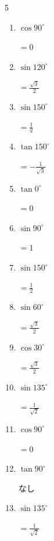 \begin{multicols}{5}
\begin{enumerate}
        $\displaystyle =\frac{\sqrt{3}}{2}$

  \item $\displaystyle \cos{90^\circ}$

        $\displaystyle =0$

  \item $\displaystyle \sin{120^\circ}$

        $\displaystyle =\frac{\sqrt{3}}{2}$

  \item $\displaystyle \sin{150^\circ}$

        $\displaystyle =\frac{1}{2}$

  \item $\displaystyle \tan{150^\circ}$

        $\displaystyle =-\frac{1}{\sqrt{3}}$

  \item $\displaystyle \tan{0^\circ}$

        $\displaystyle =0$

  \item $\displaystyle \sin{90^\circ}$

        $\displaystyle =1$

  \item $\displaystyle \sin{150^\circ}$

        $\displaystyle =\frac{1}{2}$

  \item $\displaystyle \sin{60^\circ}$

        $\displaystyle =\frac{\sqrt{3}}{2}$

  \item $\displaystyle \cos{30^\circ}$

        $\displaystyle =\frac{\sqrt{3}}{2}$

  \item $\displaystyle \sin{135^\circ}$

        $\displaystyle =\frac{1}{\sqrt{2}}$

  \item $\displaystyle \cos{90^\circ}$

        $\displaystyle =0$

  \item $\displaystyle \tan{90^\circ}$

        $\displaystyle なし$

  \item $\displaystyle \sin{135^\circ}$

        $\displaystyle =\frac{1}{\sqrt{2}}$


\end{enumerate}
\end{multicols}
